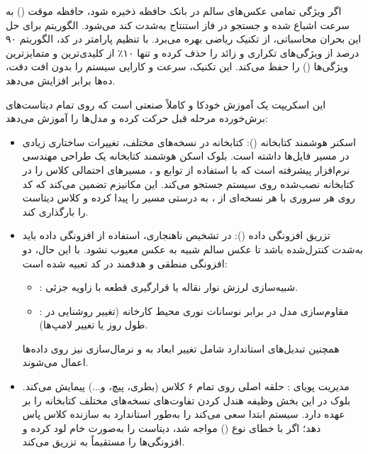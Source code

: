 \documentclass{article}
\begin{document}
اگر ویژگی تمامی عکس‌های سالم در بانک حافظه ذخیره شود، حافظه موقت () به سرعت اشباع شده و جستجو در فاز استنتاج به‌شدت کند می‌شود. الگوریتم  برای حل این بحران محاسباتی، از تکنیک ریاضی  بهره می‌برد. با تنظیم پارامتر  در کد، الگوریتم ۹۰ درصد از ویژگی‌های تکراری و زائد را حذف کرده و تنها ۱۰٪ از کلیدی‌ترین و متمایزترین ویژگی‌ها () را حفظ می‌کند. این تکنیک، سرعت و کارایی سیستم را بدون افت دقت، ده‌ها برابر افزایش می‌دهد.


این اسکریپت یک آموزش خودکا و کاملاً صنعتی است که روی تمام دیتاست‌های برش‌خورده مرحله قبل حرکت کرده و مدل‌ها را آموزش می‌دهد:

\begin{itemize}
	\item اسکنر هوشمند کتابخانه (): کتابخانه  در نسخه‌های مختلف، تغییرات ساختاری زیادی در مسیر فایل‌ها داشته است. بلوک اسکن هوشمند کتابخانه یک طراحی مهندسی نرم‌افزار پیشرفته است که با استفاده از توابع  و ، مسیرهای احتمالی کلاس  را در کتابخانه نصب‌شده روی سیستم جستجو می‌کند. این مکانیزم تضمین می‌کند که کد روی هر سروری با هر نسخه‌ای از ، به درستی مسیر را پیدا کرده و کلاس دیتاست را بارگذاری کند.
	
	\item تزریق افزونگی داده (): در تشخیص ناهنجاری، استفاده از افزونگی داده باید به‌شدت کنترل‌شده باشد تا عکس سالم شبیه به عکس معیوب نشود. با این حال، دو افزونگی منطقی و هدفمند در کد تعبیه شده است:
	\begin{itemize}
		\item {}: شبیه‌سازی لرزش نوار نقاله یا قرارگیری قطعه با زاویه جزئی.
		\item {}: مقاوم‌سازی مدل در برابر نوسانات نوری محیط کارخانه (تغییر روشنایی در طول روز یا تغییر لامپ‌ها).
	\end{itemize}
	همچنین تبدیل‌های استاندارد شامل تغییر ابعاد به  و نرمال‌سازی  نیز روی داده‌ها اعمال می‌شوند.
	
	\item مدیریت پویای : حلقه اصلی روی تمام ۶ کلاس (بطری، پیچ، و...) پیمایش می‌کند. بلوک  در این بخش وظیفه هندل کردن تفاوت‌های نسخه‌های مختلف کتابخانه را بر عهده دارد. سیستم ابتدا سعی می‌کند  را به‌طور استاندارد به سازنده کلاس پاس دهد؛ اگر با خطای نوع () مواجه شد، دیتاست را به‌صورت خام لود کرده و افزونگی‌ها را مستقیماً به  تزریق می‌کند.
	

\end{itemize}
\end{document}
